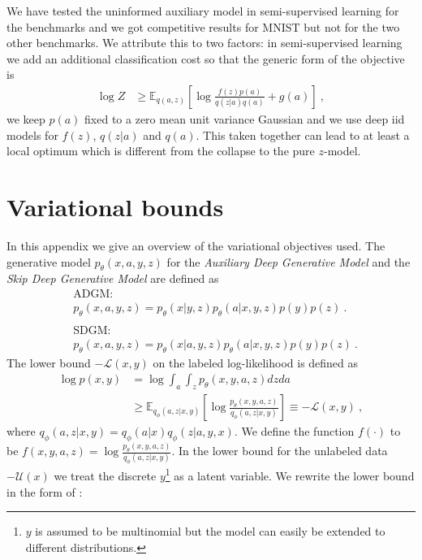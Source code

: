 \documentclass{article}
\begin{document}
We have tested the uninformed auxiliary model in semi-supervised learning for the benchmarks and we got competitive results for MNIST but not for the two other benchmarks. We attribute this to two factors: in semi-supervised learning we add an additional classification cost so that the generic form of the objective is 
\begin{align}
\log Z & \ge \mathbb{E}_{q(a,z)} \left [ \log \frac{f(z)p(a)}{q(z|a)q(a)} + g(a) \right ] \ , 
\end{align}
we keep $p(a)$ fixed to a zero mean unit variance Gaussian and we use deep iid models for $f(z)$, $q(z|a)$ and $q(a)$. This taken together can lead to at least a local optimum which is different from the collapse to the pure $z$-model. 

\newpage
\section{Variational bounds} \label{app:variational_bounds}
In this appendix we give an overview of the variational objectives used.
The generative model $p_\theta(x,a,y,z)$ for the \emph{Auxiliary Deep Generative Model} and the \emph{Skip Deep Generative Model} are defined as
\begin{align}
&\text{ADGM:}\nonumber\\  
&p_\theta(x,a,y,z) = p_\theta(x|y,z)p_\theta(a|x,y,z)p(y)p(z)\ . \\
\nonumber\\
&\text{SDGM:}\nonumber\\  
&p_\theta(x,a,y,z) = p_\theta(x|a,y,z)p_\theta(a|x,y,z)p(y)p(z)\ .
\end{align}
The lower bound $-\mathcal{L}(x,y)$ on the labeled log-likelihood is defined as
\begin{align}
\log p(x,y) &= \log \int_a \int_z p_\theta(x,y,a,z) dzda\\
&\ge \mathbb{E}_{q_\phi(a,z|x,y)} \left [\log \frac{p_\theta(x,y,a,z)}{q_\phi(a,z|x,y)} \right] \equiv -\mathcal{L}(x,y)\ , \nonumber
\end{align}
where $q_\phi(a,z|x,y)=q_\phi(a|x)q_\phi(z|a,y,x)$. We define the function $f(\cdot)$ to be $f(x,y,a,z) = \log \frac{p_\theta(x,y,a,z)}{q_\phi(a,z|x,y)}$. In the lower bound for the unlabeled data $-\mathcal{U}(x)$ we treat the discrete $y$\footnote{$y$ is assumed to be multinomial but the model can easily be extended to different distributions.} as a latent variable. We rewrite the lower bound in the form of \citet{Kingma14}:
\end{document}
